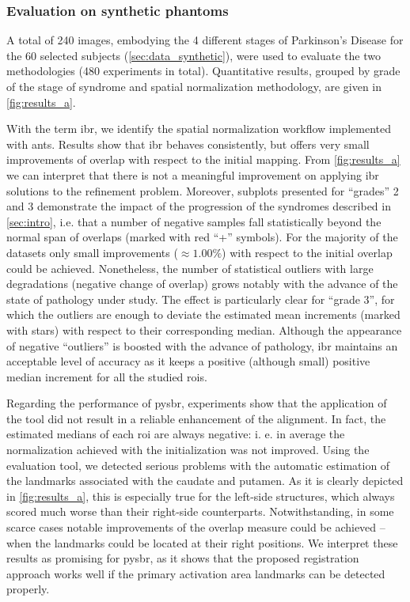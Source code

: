 \documentclass{frontiers}
\begin{document}

\subsubsection{Evaluation on synthetic phantoms}
\label{sec:results_phantoms}
A total of 240 images, embodying the 4 different stages
  of Parkinson's Disease for the 60 selected subjects
  (\autoref{sec:data_synthetic}), were used to evaluate
  the two methodologies (480 experiments in total).
Quantitative results, grouped by grade of the stage of
  syndrome and spatial normalization methodology, 
  are given in \autoref{fig:results_a}.

With the term \gls*{ibr}, we identify the spatial normalization
  workflow implemented with \gls*{ants}.
Results show that \gls*{ibr} behaves consistently,
  but offers very small improvements of overlap with respect to the
  initial mapping.
From \autoref{fig:results_a} we can interpret that there is not 
  a meaningful improvement on applying \gls*{ibr} solutions to 
  the refinement problem.
Moreover, subplots presented for ``grades'' 2 and 3 demonstrate the
  impact of the progression of the syndromes described in 
  \autoref{sec:intro}, i.e. that a number of negative samples fall 
   statistically beyond the normal span of overlaps (marked with red ``+'' symbols).
For the majority of the datasets only small improvements ($\approx1.00\%$)
  with respect to the initial overlap could be achieved.
Nonetheless, the number of statistical outliers with large degradations
  (negative change of overlap) grows notably with the advance of the state of
  pathology under study.
The effect is particularly clear for ``grade 3'', for which the outliers are enough
  to deviate the estimated mean increments (marked with stars) with respect to their
  corresponding median.
Although the appearance of negative ``outliers'' is boosted with the advance
  of pathology, \gls*{ibr} maintains an acceptable level of accuracy as it keeps
  a positive (although small) positive median increment for all the studied \glspl*{roi}.
  
Regarding the performance of \gls*{pysbr}, experiments show that the application of the tool
  did not result in a reliable enhancement of the alignment.
In fact, the estimated medians of each \gls*{roi} are always negative: i. e. in average
  the normalization achieved with the initialization was not improved.
Using the evaluation tool, we detected serious problems with the automatic 
  estimation of the landmarks associated with the caudate and putamen.
As it is clearly depicted in \autoref{fig:results_a}, this is especially true for the left-side
  structures, which always scored much worse than their right-side counterparts.
Notwithstanding, in some scarce cases notable improvements of the overlap measure could be achieved
  --  when the landmarks could be located at their right positions.
We interpret these results as promising for \gls*{pysbr}, as it shows that the proposed registration 
  approach works well if the primary activation area landmarks can be detected properly.
\end{document}
